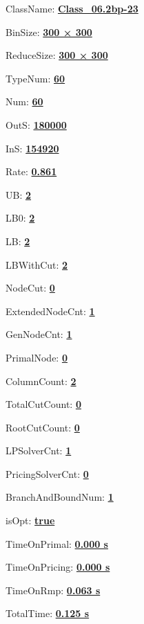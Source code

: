 \documentclass[11pt]{article}
\begin{document}
\pagestyle{empty}


ClassName: \underline{\textbf{Class_06.2bp-23}}
\par
BinSize: \underline{\textbf{300 × 300}}
\par
ReduceSize: \underline{\textbf{300 × 300}}
\par
TypeNum: \underline{\textbf{60}}
\par
Num: \underline{\textbf{60}}
\par
OutS: \underline{\textbf{180000}}
\par
InS: \underline{\textbf{154920}}
\par
Rate: \underline{\textbf{0.861}}
\par
UB: \underline{\textbf{2}}
\par
LB0: \underline{\textbf{2}}
\par
LB: \underline{\textbf{2}}
\par
LBWithCut: \underline{\textbf{2}}
\par
NodeCut: \underline{\textbf{0}}
\par
ExtendedNodeCnt: \underline{\textbf{1}}
\par
GenNodeCnt: \underline{\textbf{1}}
\par
PrimalNode: \underline{\textbf{0}}
\par
ColumnCount: \underline{\textbf{2}}
\par
TotalCutCount: \underline{\textbf{0}}
\par
RootCutCount: \underline{\textbf{0}}
\par
LPSolverCnt: \underline{\textbf{1}}
\par
PricingSolverCnt: \underline{\textbf{0}}
\par
BranchAndBoundNum: \underline{\textbf{1}}
\par
isOpt: \underline{\textbf{true}}
\par
TimeOnPrimal: \underline{\textbf{0.000 s}}
\par
TimeOnPricing: \underline{\textbf{0.000 s}}
\par
TimeOnRmp: \underline{\textbf{0.063 s}}
\par
TotalTime: \underline{\textbf{0.125 s}}
\par
\newpage
\end{document}

